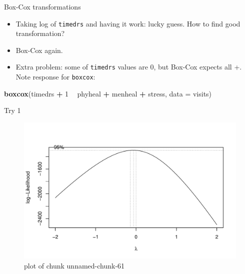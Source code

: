 \documentclass[ignorenonframetext,]{beamer}
\newenvironment{Shaded}{\begin{snugshade}}{\end{snugshade}}
\newcommand{\DataTypeTok}[1]{\textcolor[rgb]{0.13,0.29,0.53}{#1}}
\newcommand{\DecValTok}[1]{\textcolor[rgb]{0.00,0.00,0.81}{#1}}
\newcommand{\KeywordTok}[1]{\textcolor[rgb]{0.13,0.29,0.53}{\textbf{#1}}}
\newcommand{\NormalTok}[1]{#1}
\newcommand{\OperatorTok}[1]{\textcolor[rgb]{0.81,0.36,0.00}{\textbf{#1}}}
\newcommand{\StringTok}[1]{\textcolor[rgb]{0.31,0.60,0.02}{#1}}
\begin{document}
\begin{frame}[fragile]{Box-Cox transformations}
\protect\hypertarget{box-cox-transformations}{}

\begin{itemize}
\item
  Taking log of \texttt{timedrs} and having it work: lucky guess. How to
  find good transformation?
\item
  Box-Cox again.
\item
  Extra problem: some of \texttt{timedrs} values are 0, but Box-Cox
  expects all +. Note response for \texttt{boxcox}:
\end{itemize}

\begin{Shaded}
\begin{Highlighting}[]
\KeywordTok{boxcox}\NormalTok{(timedrs }\OperatorTok{+}\StringTok{ }\DecValTok{1} \OperatorTok{~}\StringTok{ }\NormalTok{phyheal }\OperatorTok{+}\StringTok{ }\NormalTok{menheal }\OperatorTok{+}\StringTok{ }\NormalTok{stress, }\DataTypeTok{data =}\NormalTok{ visits)}
\end{Highlighting}
\end{Shaded}

\end{frame}

\begin{frame}{Try 1}
\protect\hypertarget{try-1}{}

\begin{figure}
\centering
\includegraphics{figure/unnamed-chunk-61-1.pdf}
\caption{plot of chunk unnamed-chunk-61}
\end{figure}

\end{frame}
\end{document}
